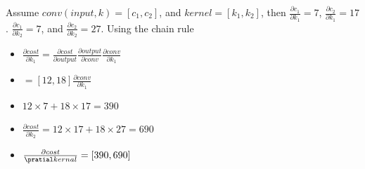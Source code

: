 \documentclass[main.tex]{subfiles}
\begin{document}
\begin{enumerate}
\begin{enumerate}
        Assume $conv(input,k)=[c_1,c_2]$, and $kernel=[k_1,k_2]$, then $\frac{\partial c_1}{\partial k_1} = 7$, $\frac{\partial c_2}{\partial k_1} = 17$. $\frac{\partial c_1}{\partial k_2} = 7$, and $\frac{\partial c_2}{\partial k_2} = 27$. Using the chain rule 
        
        \begin{itemize}[label={}]
            \item $\frac{\partial cost}{\partial k_1} = \frac{\partial cost}{\partial output} \frac{\partial output}{\partial conv} \frac{\partial conv}{\partial k_1}$
            \item $=[12,18]\frac{\partial conv}{\partial k_1}$
            \item $12\times7+18\times17=390$
            \item $\frac{\partial cost}{\partial k_2} = 12\times17+18\times27=690$
            \item $\frac{\partial cost}{\pratial kernal} = [390,690]$
        \end{itemize}
        \end{enumerate}
\end{enumerate}
\end{document}
